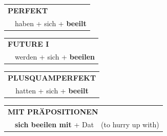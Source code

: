 \documentclass[10pt,a4paper]{revtex4-2}
\begin{document}
\begin{verbbox}
 \begin{tabular}{rl}
     \multicolumn{2}{l}{\textbf{PERFEKT}}\\
    &haben + sich + \textbf{beeilt}\\
  \end{tabular}
\hfill
   \begin{tabular}{rl}
   
    \multicolumn{2}{l}{\textbf{FUTURE I} }\\
    &werden + sich + \textbf{beeilen}\\
 
  \end{tabular}
\hfill
   \begin{tabular}{rl}
      \multicolumn{2}{l}{\textbf{PLUSQUAMPERFEKT}}\\
    &hatten + sich + \textbf{beeilt}\\
  \end{tabular}
  
\vspace{10pt}

   \begin{tabular}{lll}
      \multicolumn{3}{l}{\textbf{MIT PRÄPOSITIONEN}}\\
& \textbf{sich beeilen mit} + Dat & (to hurry up with)
  \end{tabular}
  
  \vspace{-5pt}

\end{verbbox}
\end{document}
